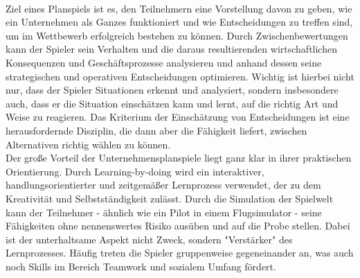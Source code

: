 \\
Ziel eines Planspiels ist es, den Teilnehmern eine Vorstellung davon zu geben, wie ein Unternehmen als Ganzes funktioniert und wie Entscheidungen zu treffen sind, um im Wettbewerb erfolgreich bestehen zu können. Durch Zwischenbewertungen kann der Spieler sein Verhalten und die daraus resultierenden wirtschaftlichen Konsequenzen und Geschäftsprozesse analysieren und anhand dessen seine strategischen und operativen Entscheidungen optimieren. Wichtig ist hierbei nicht nur, dass der Spieler Situationen erkennt und analysiert, sondern insbesondere auch, dass er die Situation einschätzen kann und lernt, auf die richtig Art und Weise zu reagieren. Das Kriterium der Einschätzung von Entscheidungen ist eine herausfordernde Disziplin, die dann aber die Fähigkeit liefert, zwischen Alternativen richtig wählen zu können.
\\
Der große Vorteil der Unternehmensplanspiele liegt ganz klar in ihrer praktischen Orientierung. Durch Learning-by-doing wird ein interaktiver, handlungsorientierter und zeitgemäßer Lernprozess verwendet, der zu dem Kreativität und Selbstständigkeit zulässt. Durch die Simulation der Spielwelt kann der Teilnehmer - ähnlich wie ein Pilot in einem Flugsimulator - seine Fähigkeiten ohne nennenswertes Risiko ausüben und auf die Probe stellen. Dabei ist der unterhaltsame Aspekt nicht Zweck, sondern "Verstärker" des Lernprozesses. Häufig treten die Spieler gruppenweise gegeneinander an, was auch noch Skills im Bereich Teamwork und sozialem Umfang fördert. 
